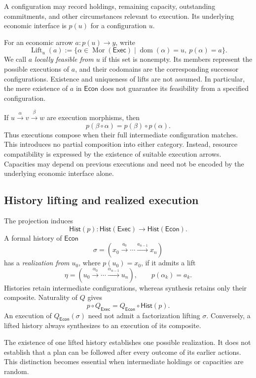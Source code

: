 \documentclass[11pt,a4paper]{article}
\newcommand{\Econ}{\mathsf{Econ}}
\newcommand{\Hist}{\mathsf{Hist}}
\begin{document}
A configuration may record holdings, remaining capacity, outstanding
commitments, and other circumstances relevant to execution. Its underlying
economic interface is $p(u)$ for a configuration $u$.

For an economic arrow $a:p(u)\to y$, write
\[
\operatorname{Lift}_u(a)
	:=
\{\alpha\in\operatorname{Mor}(\mathsf{Exec})
	\mid
\operatorname{dom}(\alpha)=u,\ p(\alpha)=a\}.
\]
We call $a$ \emph{locally feasible from $u$} if this set is nonempty.
Its members represent the possible executions of $a$, and their codomains
are the corresponding successor configurations. Existence and uniqueness
of lifts are not assumed. In particular, the mere existence of $a$ in
$\Econ$ does not guarantee its feasibility from a specified configuration.

If $u\xrightarrow{\alpha}v\xrightarrow{\beta}w$ are execution morphisms,
then
\[
    p(\beta\circ\alpha)=p(\beta)\circ p(\alpha).
\]
Thus executions compose when their full intermediate configuration matches.
This introduces no partial composition into either category. Instead,
resource compatibility is expressed by the existence of suitable execution
arrows. Capacities may depend on previous executions and need not be
encoded by the underlying economic interface alone.

\subsection{History lifting and realized execution}

The projection induces
\[
  \Hist(p):\Hist(\mathsf{Exec})\longrightarrow\Hist(\Econ).
\]
A formal history 
of $\Econ$
\[
\sigma=(
	x_0
		\xrightarrow{a_0}
	\cdots
		\xrightarrow{a_{n-1}}
	x_n
)
\]
has a \emph{realization from $u_0$}, where $p(u_0)=x_0$, if it admits a lift
\[
\eta = (
	u_0
		\xrightarrow{\alpha_0}
	\cdots
		\xrightarrow{\alpha_{n-1}}
	u_n
),
		\qquad
p(\alpha_k)=a_k.
\]
Histories retain intermediate configurations, whereas synthesis retains
only their composite. Naturality of $Q$ gives
\[
  p\circ Q_{\mathsf{Exec}}=Q_{\Econ}\circ\Hist(p).
\]
An execution of $Q_{\Econ}(\sigma)$ need not admit a factorization lifting
$\sigma$. Conversely, a lifted history always synthesizes to an execution
of its composite.

The existence of one lifted history establishes one possible realization.
It does not establish that a plan can be followed after every outcome of
its earlier actions. This distinction becomes essential when intermediate
holdings or capacities are random.
\end{document}

